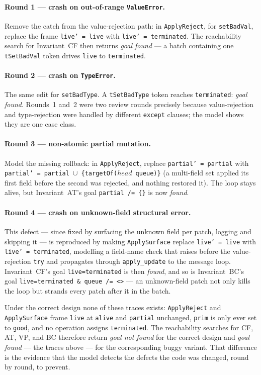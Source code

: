\documentclass[a4paper,10pt,fleqn]{article}
\begin{document}
\paragraph{Round 1 --- crash on out-of-range \texttt{ValueError}.}
Remove the catch from the value-rejection path: in \texttt{ApplyReject},
for \texttt{setBadVal}, replace the frame \texttt{live' = live} with
\texttt{live' = terminated}.  The reachability search for Invariant~CF then
returns \emph{goal found} --- a batch containing one \texttt{tSetBadVal}
token drives \texttt{live} to \texttt{terminated}.

\paragraph{Round 2 --- crash on \texttt{TypeError}.}
The same edit for \texttt{setBadType}.  A \texttt{tSetBadType} token
reaches \texttt{terminated}: \emph{goal found}.  Rounds~1 and~2 were two
review rounds precisely because value-rejection and type-rejection were
handled by different \texttt{except} clauses; the model shows they are one
case class.

\paragraph{Round 3 --- non-atomic partial mutation.}
Model the missing rollback: in \texttt{ApplyReject}, replace
\texttt{partial' = partial} with
\texttt{partial' = partial $\cup$ \{targetOf($head$~queue)\}} (a
multi-field set applied its first field before the second was rejected, and
nothing restored it).  The loop stays alive, but Invariant~AT's goal
\texttt{partial /= \{\}} is now \emph{found}.

\paragraph{Round 4 --- crash on unknown-field structural error.}
This defect --- since fixed by surfacing the unknown field per patch, logging
and skipping it --- is reproduced by making \texttt{ApplySurface} replace
\texttt{live' = live} with \texttt{live' = terminated}, modelling a field-name
check that raises before the value-rejection \texttt{try} and propagates
through \texttt{apply\_update} to the message loop.  Invariant~CF's goal
\texttt{live=terminated} is then \emph{found}, and so is Invariant~BC's goal
\texttt{live=terminated \& queue /= <>} --- an unknown-field patch not only
kills the loop but strands every patch after it in the batch.

Under the correct design none of these traces exists: \texttt{ApplyReject}
and \texttt{ApplySurface} frame \texttt{live} at \texttt{alive} and
\texttt{partial} unchanged, \texttt{prim} is only ever set to \texttt{good},
and no operation assigns \texttt{terminated}.  The reachability searches for
CF, AT, VP, and BC therefore return \emph{goal not found} for the correct
design and \emph{goal found} --- the traces above --- for the corresponding
buggy variant.  That difference is the evidence that the model detects the
defects the code was changed, round by round, to prevent.
\end{document}
